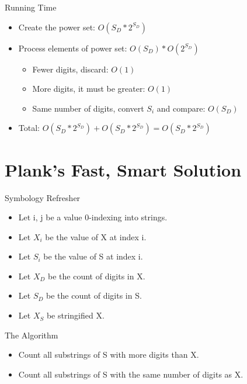 \documentclass[10pt]{beamer}
\begin{document}
\begin{frame}{Running Time}
  \Large
  \begin{itemize} %
    \item Create the power set: $O(S_{D}*2^{S_{D}})$
    \item Process elements of power set: $O(S_{D}) * O(2^{S_{D}})$
      \begin{itemize}
        \large
        \item Fewer digits, discard: $O(1)$
        \item More digits, it must be greater: $O(1)$
        \item Same number of digits, convert $S_i$ and compare: $O(S_{D})$
      \end{itemize}
    \item Total: $O(S_{D}*2^{S_{D}}) + O(S_{D}*2^{S_{D}}) = O(S_{D}*2^{S_{D}})$
  \end{itemize}
\end{frame}

\section{Plank's Fast, Smart Solution}

\begin{frame}{Symbology Refresher}
  \Large
  \begin{itemize} %
    \item Let i, j be a value 0-indexing into strings.
    \item Let $X_{i}$ be the value of X at index i.
    \item Let $S_{i}$ be the value of S at index i.
    \item Let $X_{D}$ be the count of digits in X.
    \item Let $S_{D}$ be the count of digits in S.
    \item Let $X_{S}$ be stringified X.
  \end{itemize}
\end{frame}

\begin{frame}{The Algorithm}
  \huge
  \begin{itemize} %
    \item Count all substrings of S with more digits than X. \\
    \item Count all substrings of S with the same number of digits as X. \\
  \end{itemize}
\end{frame}
\end{document}
